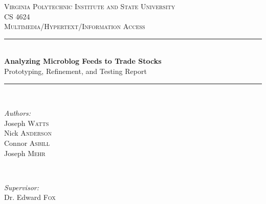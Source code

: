 
\begin{titlepage}

\newcommand{\HRule}{\rule{\linewidth}{0.5mm}} %

\center %
 

\LARGE\textsc{Virginia Polytechnic Institute and State University}\\[0.5cm] %
\textsc{\Large CS 4624}\\ %
\textsc{\large Multimedia/Hypertext/Information Access}\\[0.5cm] %


\HRule \\[0.4cm]
{ \huge \bfseries Analyzing Microblog Feeds to Trade Stocks}\\[0.2cm] %
{ \large \sc Prototyping, Refinement, and Testing Report}
\HRule \\[1.5cm]
 

\begin{minipage}{0.4\textwidth}
\begin{flushleft} \large
\emph{Authors:}\\
Joseph \textsc{Watts} \\
Nick \textsc{Anderson} \\
Connor \textsc{Asbill} \\
Joseph \textsc{Mehr}

\end{flushleft}
\end{minipage}
~
\begin{minipage}{0.4\textwidth}
\begin{flushright} \large
\emph{Supervisor:} \\
Dr. Edward \textsc{Fox} \\[0.3em]


\end{flushright}
\end{minipage}
\end{titlepage}
